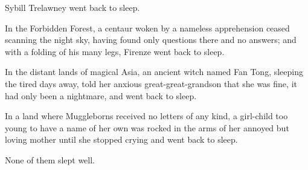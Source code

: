 Sybill Trelawney went back to sleep.

In the Forbidden Forest, a centaur woken by a nameless apprehension ceased
scanning the night sky, having found only questions there and no answers; and
with a folding of his many legs, Firenze went back to sleep.

In the distant lands of magical Asia, an ancient witch named Fan Tong, sleeping
the tired days away, told her anxious great-great-grandson that she was fine,
it had only been a nightmare, and went back to sleep.

In a land where Muggleborns received no letters of any kind, a girl-child too
young to have a name of her own was rocked in the arms of her annoyed but
loving mother until she stopped crying and went back to sleep.

None of them slept well.
